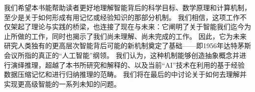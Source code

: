 \documentclass[../../book-main_zh.tex]{subfiles}
\begin{document}
我们希望本书能帮助读者更好地理解智能背后的科学目标、数学原理和计算机制，至少是关于如何形成有用记忆或经验知识的那部分机制。
我们相信，这项工作不仅架起了理论与实践的桥梁，也连接了现在与未来：它阐明了关于智能我们迄今为止所做的工作，同时也揭示了我们尚未理解、尚未完成的工作。
因此，它为未来研究人类独有的更高层次智能背后可能的新机制奠定了基础——即1956年达特茅斯会议所指的真正的“人工智能”纲领。
我们认为，这种机制能够创造抽象概念并进行演绎推理，超越了本书所研究和解释的、以及当前“AI”技术在利用的基于经验数据压缩记忆和进行归纳推理的范畴。
我们将在最后的中讨论关于如何去理解并实现更高级智能的一系列未知的问题。
\end{document}
